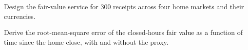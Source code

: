 \begin{interviewq}\label{iq:hf:depositary-receipts-and-dual-listings:5}
Design the fair-value service for 300 receipts across four home markets and their currencies.
\end{interviewq}

\begin{interviewq}\label{iq:hf:depositary-receipts-and-dual-listings:6}
Derive the root-mean-square error of the closed-hours fair value as a function of time since the home close, with and without the proxy.
\end{interviewq}
